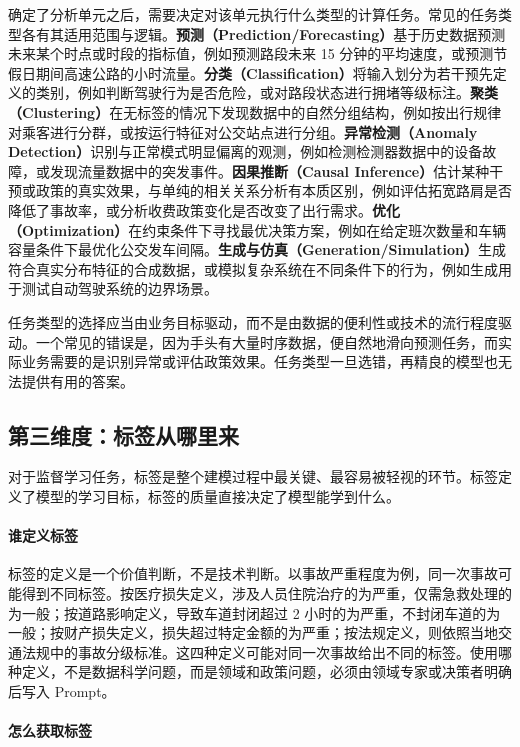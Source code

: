 确定了分析单元之后，需要决定对该单元执行什么类型的计算任务。常见的任务类型各有其适用范围与逻辑。\textbf{预测（Prediction/Forecasting）}基于历史数据预测未来某个时点或时段的指标值，例如预测路段未来 15 分钟的平均速度，或预测节假日期间高速公路的小时流量。\textbf{分类（Classification）}将输入划分为若干预先定义的类别，例如判断驾驶行为是否危险，或对路段状态进行拥堵等级标注。\textbf{聚类（Clustering）}在无标签的情况下发现数据中的自然分组结构，例如按出行规律对乘客进行分群，或按运行特征对公交站点进行分组。\textbf{异常检测（Anomaly Detection）}识别与正常模式明显偏离的观测，例如检测检测器数据中的设备故障，或发现流量数据中的突发事件。\textbf{因果推断（Causal Inference）}估计某种干预或政策的真实效果，与单纯的相关关系分析有本质区别，例如评估拓宽路肩是否降低了事故率，或分析收费政策变化是否改变了出行需求。\textbf{优化（Optimization）}在约束条件下寻找最优决策方案，例如在给定班次数量和车辆容量条件下最优化公交发车间隔。\textbf{生成与仿真（Generation/Simulation）}生成符合真实分布特征的合成数据，或模拟复杂系统在不同条件下的行为，例如生成用于测试自动驾驶系统的边界场景。

任务类型的选择应当由业务目标驱动，而不是由数据的便利性或技术的流行程度驱动。一个常见的错误是，因为手头有大量时序数据，便自然地滑向预测任务，而实际业务需要的是识别异常或评估政策效果。任务类型一旦选错，再精良的模型也无法提供有用的答案。

\subsection{第三维度：标签从哪里来}

对于监督学习任务，标签是整个建模过程中最关键、最容易被轻视的环节。标签定义了模型的学习目标，标签的质量直接决定了模型能学到什么。

\paragraph{谁定义标签}

标签的定义是一个价值判断，不是技术判断。以事故严重程度为例，同一次事故可能得到不同标签。按医疗损失定义，涉及人员住院治疗的为严重，仅需急救处理的为一般；按道路影响定义，导致车道封闭超过 2 小时的为严重，不封闭车道的为一般；按财产损失定义，损失超过特定金额的为严重；按法规定义，则依照当地交通法规中的事故分级标准。这四种定义可能对同一次事故给出不同的标签。使用哪种定义，不是数据科学问题，而是领域和政策问题，必须由领域专家或决策者明确后写入 Prompt。

\paragraph{怎么获取标签}

